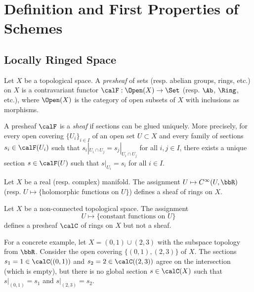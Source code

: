\section{Definition and First Properties of Schemes}


\subsection{Locally Ringed Space}

    \begin{definition}\label{def:sheaves}
        Let \(X\) be a topological space.
        A \emph{presheaf} of sets (resp. abelian groups, rings, etc.) on \(X\) is a contravariant functor \(\calF : \Open(X) \to \Set\) (resp. \(\Ab\), \(\Ring\), etc.), 
        where \(\Open(X)\) is the category of open subsets of \(X\) with inclusions as morphisms.

        A presheaf \(\calF\) is a \emph{sheaf} if sections can be glued uniquely.
        More precisely, for every open covering \(\{U_i\}_{i \in I}\) of an open set \(U \subset X\) and every family of sections \(s_i \in \calF(U_i)\) such that \(s_i|_{U_i \cap U_j} = s_j|_{U_i \cap U_j}\) for all \(i,j \in I\),
        there exists a unique section \(s \in \calF(U)\) such that \(s|_{U_i} = s_i\) for all \(i \in I\).
    \end{definition}

    \begin{example}\label{eg:sheaf_of_smooth_and_analytic_functions}
        Let \(X\) be a real (resp. complex) manifold.
        The assignment \(U \mapsto C^\infty(U, \bbR)\) (resp. \(U \mapsto \{\text{holomorphic functions on }U\}\)) defines a sheaf of rings on \(X\).
    \end{example}

    \begin{example}\label{eg:presheaf_but_not_sheaf}
        Let \(X\) be a non-connected topological space.
        The assignment 
        \[U \mapsto \{\text{constant functions on }U\}\] 
        defines a presheaf \(\calC\) of rings on \(X\) but not a sheaf.

        For a concrete example, let \(X = (0,1)\cup (2,3)\) with the subspace topology from \(\bbR\).
        Consider the open covering \(\{(0,1), (2,3)\}\) of \(X\).
        The sections \(s_1 = 1 \in \calC((0,1))\) and \(s_2 = 2 \in \calC((2,3))\) agree on the intersection (which is empty), 
        but there is no global section \(s \in \calC(X)\) such that \(s|_{(0,1)} = s_1\) and \(s|_{(2,3)} = s_2\).
    \end{example}

